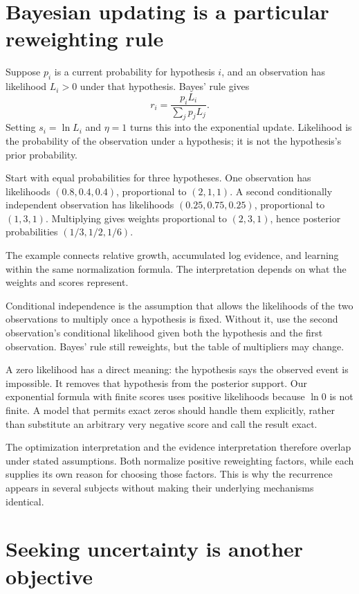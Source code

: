 \documentclass[11pt,oneside,openany]{book}
\theoremstyle{definition}
\theoremstyle{remark}
\numberwithin{equation}{chapter}
\begin{document}
\section{Bayesian updating is a particular reweighting rule}\label{ch09-bayesian-updating-is-a-particular-reweighting-rule}

Suppose \(p_i\) is a current probability for hypothesis \(i\), and an observation has likelihood \(L_i>0\) under that hypothesis. Bayes' rule gives \[r_i=\frac{p_iL_i}{\sum_jp_jL_j}.\] Setting \(s_i=\ln L_i\) and \(\eta=1\) turns this into the exponential update. Likelihood is the probability of the observation under a hypothesis; it is not the hypothesis's prior probability.

Start with equal probabilities for three hypotheses. One observation has likelihoods \((0.8,0.4,0.4)\), proportional to \((2,1,1)\). A second conditionally independent observation has likelihoods \((0.25,0.75,0.25)\), proportional to \((1,3,1)\). Multiplying gives weights proportional to \((2,3,1)\), hence posterior probabilities \((1/3,1/2,1/6)\).

The example connects relative growth, accumulated log evidence, and learning within the same normalization formula. The interpretation depends on what the weights and scores represent.

Conditional independence is the assumption that allows the likelihoods of the two observations to multiply once a hypothesis is fixed. Without it, use the second observation's conditional likelihood given both the hypothesis and the first observation. Bayes' rule still reweights, but the table of multipliers may change.

A zero likelihood has a direct meaning: the hypothesis says the observed event is impossible. It removes that hypothesis from the posterior support. Our exponential formula with finite scores uses positive likelihoods because \(\ln0\) is not finite. A model that permits exact zeros should handle them explicitly, rather than substitute an arbitrary very negative score and call the result exact.

The optimization interpretation and the evidence interpretation therefore overlap under stated assumptions. Both normalize positive reweighting factors, while each supplies its own reason for choosing those factors. This is why the recurrence appears in several subjects without making their underlying mechanisms identical.

\section{Seeking uncertainty is another objective}\label{ch09-seeking-uncertainty-is-another-objective}
\end{document}
